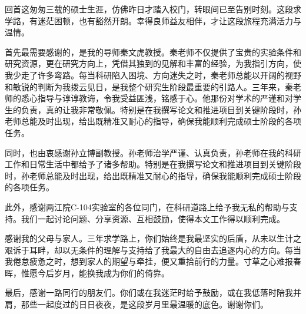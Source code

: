 \acknowledgement
回首这匆匆三载的硕士生涯，仿佛昨日才踏入校门，转眼间已至告别时刻。这段求学路，有迷茫困顿，也有豁然开朗。幸得良师益友相伴，才让这段旅程充满活力与温情。

首先最需要感谢的，是我的导师秦文虎教授。秦老师不仅提供了宝贵的实验条件和研究资源，更在研究方向上，凭借其独到的见解和丰富的经验，为我指引方向，使我少走了许多弯路。每当科研陷入困境、方向迷失之时，秦老师总能以开阔的视野和敏锐的判断为我拨云见日，是我整个研究生阶段最重要的引路人。三年来，秦老师的悉心指导与谆谆教诲，令我受益匪浅，铭感于心。他那份对学术的严谨和对学生的负责，真的让我非常敬佩。特别是在我撰写论文和推进项目到关键阶段时，孙老师总能及时出现，给出既精准又耐心的指导，确保我能顺利完成硕士阶段的各项任务。

同时，也由衷感谢孙立博副教授。孙老师治学严谨、认真负责，孙老师在我的科研工作和日常生活中都给予了诸多帮助。特别是在我撰写论文和推进项目到关键阶段时，孙老师总能及时出现，给出既精准又耐心的指导，确保我能顺利完成硕士阶段的各项任务。

此外，感谢两江院C-104实验室的各位同门，在科研道路上给予我无私的帮助与支持。我们一起讨论问题、分享资源、互相鼓励，使得本文工作得以顺利完成。

感谢我的父母与家人。三年求学路上，你们始终是我最坚实的后盾，从未以生计之艰诉于耳畔，却以无条件的理解与支持给了我最大的自由去追逐内心的方向。每当我倦怠疲惫之时，想到家人的期望与牵挂，便又重拾前行的力量。寸草之心难报春晖，惟愿今后岁月，能换我成为你们的倚靠。

最后，感谢一路同行的朋友们。你们或在我迷茫时给予鼓励，或在我低落时陪我并肩，那些一起度过的日日夜夜，是这段岁月里最温暖的底色。谢谢你们。

